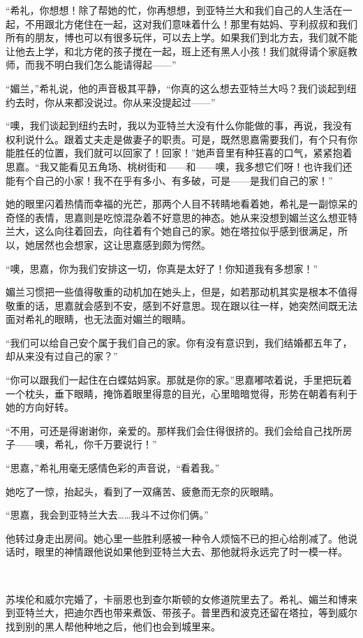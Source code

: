 \par “希礼，你想想！除了帮她的忙，你再想想，到亚特兰大和我们自己的人生活在一起，不用跟北方佬住在一起，这对我们意味着什么！那里有姑妈、亨利叔叔和我们所有的朋友，博也可以有很多玩伴，可以去上学。如果我们到北方去，我们就不能让他去上学，和北方佬的孩子搅在一起，班上还有黑人小孩！我们就得请个家庭教师，而我不明白我们怎么能请得起——”
\par “媚兰，”希礼说，他的声音极其平静，“你真的这么想去亚特兰大吗？我们谈起到纽约去时，你从来都没说过。你从来没提起过——”
\par “噢，我们谈起到纽约去时，我以为亚特兰大没有什么你能做的事，再说，我没有权利说什么。跟着丈夫走是做妻子的职责。可是，既然思嘉需要我们，有个只有你能胜任的位置，我们就可以回家了！回家！”她声音里有种狂喜的口气，紧紧抱着思嘉。“我又能看见五角场、桃树街和——和——噢，我多想它们呀！也许我们还能有个自己的小家！我不在乎有多小、有多破，可是——是我们自己的家！”
\par 她的眼里闪着热情而幸福的光芒，那两个人目不转睛地看着她，希礼是一副惊呆的奇怪的表情，思嘉则是吃惊混杂着不好意思的神态。她从来没想到媚兰这么想亚特兰大，这么向往着回去，向往着有个她自己的家。她在塔拉似乎感到很满足，所以，她居然也会想家，这让思嘉感到颇为愕然。
\par “噢，思嘉，你为我们安排这一切，你真是太好了！你知道我有多想家！”
\par 媚兰习惯把一些值得敬重的动机加在她头上，但是，如若那动机其实是根本不值得敬重的话，思嘉就会感到不安，感到不好意思。现在跟以往一样，她突然间既无法面对希礼的眼睛，也无法面对媚兰的眼睛。
\par “我们可以给自己安个属于我们自己的家。你有没有意识到，我们结婚都五年了，却从来没有过自己的家？”
\par “你可以跟我们一起住在白蝶姑妈家。那就是你的家。”思嘉嘟哝着说，手里把玩着一个枕头，垂下眼睛，掩饰着眼里得意的目光，心里暗暗觉得，形势在朝着有利于她的方向好转。
\par “不用，可还是得谢谢你，亲爱的。那样我们会住得很挤的。我们会给自己找所房子——噢，希礼，你千万要说行！”
\par “思嘉，”希礼用毫无感情色彩的声音说，“看着我。”
\par 她吃了一惊，抬起头，看到了一双痛苦、疲惫而无奈的灰眼睛。
\par “思嘉，我会到亚特兰大去……我斗不过你们俩。”
\par 他转过身走出房间。她心里一些胜利感被一种令人烦恼不已的担心给削减了。他说话时，眼里的神情跟他说如果他到亚特兰大去、那他就将永远完了时一模一样。
\par  
\par 苏埃伦和威尔完婚了，卡丽恩也到查尔斯顿的女修道院里去了。希礼、媚兰和博来到亚特兰大，把迪尔西也带来煮饭、带孩子。普里西和波克还留在塔拉，等到威尔找到别的黑人帮他种地之后，他们也会到城里来。

